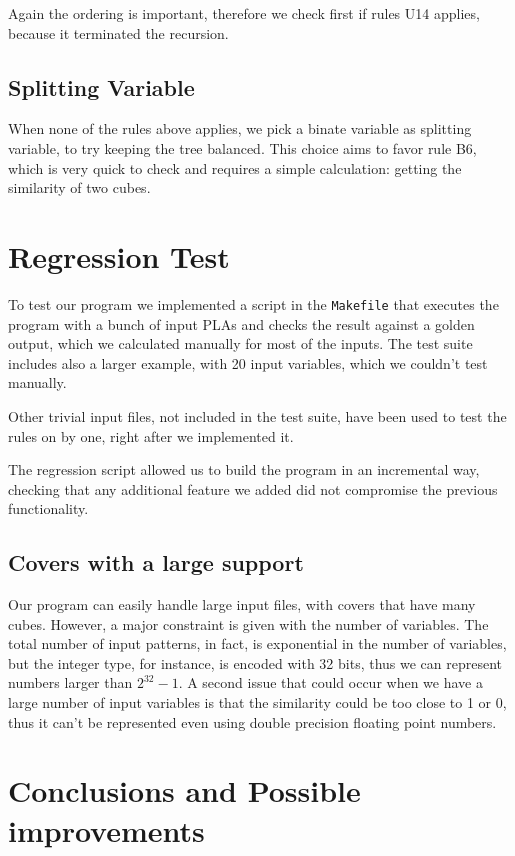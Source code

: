 \documentclass{acm_proc_article-sp}
\begin{document}
Again the ordering is important, therefore we check first if rules U14 applies,
because it terminated the recursion.

\subsection{Splitting Variable}

When none of the rules above applies, we pick a binate variable as splitting
variable, to try keeping the tree balanced. This choice aims to favor rule B6,
which is very quick to check and requires a simple calculation: getting the
similarity of two cubes.

\section{Regression Test}

To test our program we implemented a script in the \texttt{Makefile} that
executes the program with a bunch of input PLAs and checks the result against a
golden output, which we calculated manually for most of the inputs.
The test suite includes also a larger example, with 20 input variables,
which we couldn't test manually.

Other trivial input files, not included in the test suite, have been used to
test the rules on by one, right after we implemented it.

The regression script allowed us to build the program in an incremental way,
checking that any additional feature we added did not compromise the
previous functionality.


\subsection{Covers with a large support}

Our program can easily handle large input files, with covers that have many
cubes. However, a major constraint is given with the number of variables.
The total number of input patterns, in fact, is exponential in the number
of variables, but the integer type, for instance, is encoded with 32 bits,
thus we can represent numbers larger than $2^{32} - 1$.
A second issue that could occur when we have a large number of input variables
is that the similarity could be too close to 1 or 0, thus it can't be represented
even using double precision floating point numbers.

\section{Conclusions and Possible improvements}
\end{document}
